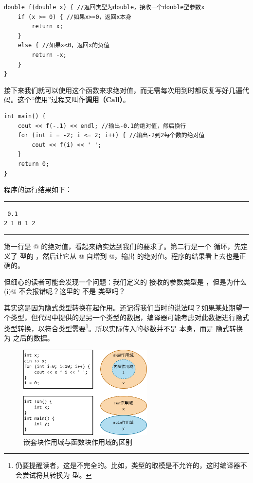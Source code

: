 \begin{lstlisting}
double f(double x) { //返回类型为double，接收一个double型参数x
    if (x >= 0) { //如果x>=0，返回x本身
        return x;
    }
    else { //如果x<0，返回x的负值
        return -x;
    }
}
\end{lstlisting}\par
接下来我们就可以使用这个函数来求绝对值，而无需每次用到时都反复写好几遍代码。这个``使用''过程又叫作\textbf{调用（Call）}。
\begin{lstlisting}
int main() {
    cout << f(-.1) << endl; //输出-0.1的绝对值，然后换行
    for (int i = -2; i <= 2; i++) { //输出-2到2每个数的绝对值
        cout << f(i) << ' ';
    }
    return 0;
}
\end{lstlisting}
程序的运行结果如下：\\\noindent\rule{\textwidth}{.2pt}\texttt{
0.1\\
2 1 0 1 2
}\\\noindent\rule{\textwidth}{.2pt}\par
第一行是 @ 的绝对值，看起来确实达到我们的要求了。第二行是一个 \lstinline@for@ 循环，先定义了 \lstinline@int@ 型的 \lstinline@i@，然后让它从 @ 自增到 @，输出 \lstinline@i@ 的绝对值。程序的结果看上去也是正确的。\par
但细心的读者可能会发现一个问题：我们定义的 \lstinline@f@ 接收的参数类型是 \lstinline@double@，但是为什么 \lstinline@f(i)@ 不会报错呢？这里的 \lstinline@i@ 不是 \lstinline@int@ 类型吗？\par
其实这是因为隐式类型转换在起作用。还记得我们当时的说法吗？如果某处期望一个类型，但代码中提供的是另一个类型的数据，编译器可能考虑对此数据进行隐式类型转换，以符合类型需要\footnote{仍要提醒读者，这是不完全的。比如，\lstinline@double@ 类型的取模是不允许的，这时编译器不会尝试将其转换为 \lstinline@int@ 型。}。所以实际传入的参数并不是 \lstinline@i@ 本身，而是 \lstinline@i@ 隐式转换为 \lstinline@double@ 之后的数据。\par
\begin{figure}[htbp]
    \centering
    \includegraphics[width=0.6\textwidth]{../images/generalized_parts/04_block_scope_and_function_scope.drawio.png}
    \caption{嵌套块作用域与函数块作用域的区别}
\end{figure}

